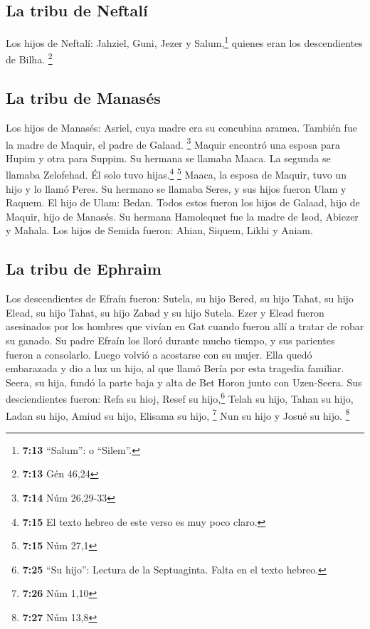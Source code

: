 \hypertarget{la-tribu-de-neftaluxed}{%
\subsection{La tribu de Neftalí}\label{la-tribu-de-neftaluxed}}

 Los hijos de Neftalí: Jahziel, Guni, Jezer y
Salum,\footnote{\textbf{7:13} ``Salum'': o ``Silem''.} quienes eran los
descendientes de Bilha. \footnote{\textbf{7:13} Gén 46,24}

\hypertarget{la-tribu-de-manasuxe9s}{%
\subsection{La tribu de Manasés}\label{la-tribu-de-manasuxe9s}}

 Los hijos de Manasés: Asriel, cuya madre era su
concubina aramea. También fue la madre de Maquir, el padre de Galaad.
\footnote{\textbf{7:14} Núm 26,29-33}  Maquir encontró
una esposa para Hupim y otra para Suppim. Su hermana se llamaba Maaca.
La segunda se llamaba Zelofehad. Él solo tuvo hijas.\footnote{\textbf{7:15}
  El texto hebreo de este verso es muy poco claro.} \footnote{\textbf{7:15}
  Núm 27,1}  Maaca, la esposa de Maquir, tuvo un hijo y
lo llamó Peres. Su hermano se llamaba Seres, y sus hijos fueron Ulam y
Raquem.  El hijo de Ulam: Bedan. Todos estos fueron los
hijos de Galaad, hijo de Maquir, hijo de Manasés.  Su
hermana Hamolequet fue la madre de Isod, Abiezer y Mahala.
 Los hijos de Semida fueron: Ahian, Siquem, Likhi y
Aniam.

\hypertarget{la-tribu-de-ephraim}{%
\subsection{La tribu de Ephraim}\label{la-tribu-de-ephraim}}

 Los descendientes de Efraín fueron: Sutela, su hijo
Bered, su hijo Tahat, su hijo Elead, su hijo Tahat,  su
hijo Zabad y su hijo Sutela. Ezer y Elead fueron asesinados por los
hombres que vivían en Gat cuando fueron allí a tratar de robar su
ganado.  Su padre Efraín los lloró durante mucho tiempo,
y sus parientes fueron a consolarlo.  Luego volvió a
acostarse con su mujer. Ella quedó embarazada y dio a luz un hijo, al
que llamó Bería por esta tragedia familiar.  Seera, su
hija, fundó la parte baja y alta de Bet Horon junto con Uzen-Seera.
 Sus desciendientes fueron: Refa su hioj, Resef su
hijo,\footnote{\textbf{7:25} ``Su hijo'': Lectura de la Septuaginta.
  Falta en el texto hebreo.} Telah su hijo, Tahan su hijo,
 Ladan su hijo, Amiud su hijo, Elisama su hijo,
\footnote{\textbf{7:26} Núm 1,10}  Nun su hijo y Josué su
hijo. \footnote{\textbf{7:27} Núm 13,8}

